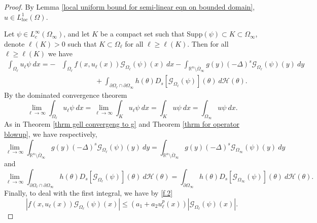 \documentclass{amsart}
\newcommand{\R}{\mathbb{R}}
\newcommand{\slap}{(-\Delta)^{s}}
\newcommand{\g}[1]{\mathcal{G}_{#1}}
\newcommand{\Ds}{D_{s}}
\newcommand{\ul}{u_{\ell}}
\begin{document}
 \begin{proof}
     By Lemma \ref{local uniform bound for semi-linear eqn on bounded domain}, $u\in L_{loc}^{1}(\Omega)$.

     Let $\psi\in L_{c}^{\infty}(\Omega_{\infty})$, and let $K$ be a compact set such that Supp$(\psi)\subset K\subset \Omega_{\infty}$, denote $\ell(K)>0$ such that $K\subset \Omega_{\ell}$ for all $\ell\geq \ell(K)$. Then for all $\ell\geq \ell(K)$ we have 
 \begin{equation*}
 \begin{split}
     \int_{\Omega_{\ell}}u_{\ell}\psi\ dx =-&\int_{\Omega_{\ell}}f\left(x,u_{\ell}(x)\right)\g{\Omega_{\ell}}(\psi)(x)\ dx-\int_{\R^{n}\setminus\overline{\Omega}_{\infty}}g(y)\slap\g{\Omega_{\ell}}(\psi)(y)\ dy\\
     &\hspace{2cm}+\int_{\partial\Omega_{\ell}\cap \partial\Omega_{\infty}}h(\theta) \Ds[\g{\Omega_{\ell}}(\psi)](\theta)\ d\mathcal{H}(\theta).
     \end{split}
 \end{equation*}
 By the dominated convergence theorem 
 \begin{equation}\label{eqn operator part convergence}
     \lim_{\ell\to\infty}\int_{\Omega_{\ell}}\ul\psi\ dx=\lim_{\ell\to \infty}\int_{K}\ul\psi\ dx=\int_{K}u\psi\ dx=\int_{\Omega_{\infty}}u\psi\ dx.
 \end{equation}
 As in Theorem \ref{thrm gell convergeng to g} and Theorem \ref{thrm for operator blowup}, we have respectively,
 \begin{equation}\label{eqn complementry part convergence}
    \lim_{\ell\to\infty} \int_{\R^{n}\setminus\overline{\Omega}_{\infty}}g(y)\slap\g{\Omega_{\ell}}(\psi)(y)\ dy= \int_{\R^{n}\setminus\overline{\Omega}_{\infty}}g(y)\slap\g{\Omega_{\infty}}(\psi)(y)\ dy
 \end{equation}
 and 
 \begin{equation}\label{eqn boundary part convergence}
     \lim_{\ell\to\infty} \int_{\partial\Omega_{\ell}\cap \partial\Omega_{\infty}}h(\theta) \Ds[\g{\Omega_{\ell}}(\psi)](\theta)\ d\mathcal{H}(\theta)=\int_{ \partial\Omega_{\infty}}h(\theta) \Ds[\g{\Omega_{\infty}}(\psi)](\theta)\ d\mathcal{H}(\theta).
 \end{equation}
 Finally, to deal with the first integral, we have by \ref{f.2}
 \begin{equation*}
     |f\left(x,u_{\ell}(x)\right)\g{\Omega_{\ell}}(\psi)(x)|\leq \left(a_{1}+a_{2}u_{\ell}^{p}(x)\right)|\g{\Omega_{\ell}}(\psi)(x)|.

\end{equation*}
\end{proof}
\end{document}
